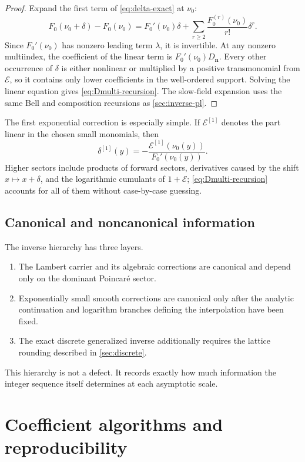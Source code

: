 \documentclass[11pt,oneside]{article}
\numberwithin{equation}{section}
\theoremstyle{plain}
\theoremstyle{definition}
\theoremstyle{remark}
\begin{document}
\begin{proof}
Expand the first term of \eqref{eq:delta-exact} at $\nu_0$:
\[
 F_0(\nu_0+\delta)-F_0(\nu_0)
 =F_0'(\nu_0)\delta+
  \sum_{r\ge2}\frac{F_0^{(r)}(\nu_0)}{r!}\delta^r.
\]
Since $F_0'(\nu_0)$ has nonzero leading term $\lambda$, it is invertible.
At any nonzero multiindex, the coefficient of the linear term is
$F_0'(\nu_0)D_{\bm n}$.  Every other occurrence of $\delta$ is either
nonlinear or multiplied by a positive transmonomial from $\mathcal E$, so it
contains only lower coefficients in the well-ordered support.  Solving the
linear equation gives \eqref{eq:Dmulti-recursion}.  The slow-field expansion
uses the same Bell and composition recursions as \cref{sec:inverse-pl}.
\end{proof}

The first exponential correction is especially simple.  If
$\mathcal E^{[1]}$ denotes the part linear in the chosen small monomials,
then
\begin{equation}\label{eq:first-exp-inverse}
 \boxed{
 \delta^{[1]}(y)=
 -\frac{\mathcal E^{[1]}(\nu_0(y))}{F_0'(\nu_0(y))}.}
\end{equation}
Higher sectors include products of forward sectors, derivatives caused by
the shift $x\mapsto x+\delta$, and the logarithmic cumulants of
$1+\mathcal E$; \eqref{eq:Dmulti-recursion} accounts for all of them without
case-by-case guessing.

\subsection{Canonical and noncanonical information}

The inverse hierarchy has three layers.
\begin{enumerate}
\item The Lambert carrier and its algebraic corrections are canonical and
      depend only on the dominant Poincar\'e sector.
\item Exponentially small smooth corrections are canonical only after the
      analytic continuation and logarithm branches defining the
      interpolation have been fixed.
\item The exact discrete generalized inverse additionally requires the
      lattice rounding described in \cref{sec:discrete}.
\end{enumerate}
This hierarchy is not a defect.  It records exactly how much information the
integer sequence itself determines at each asymptotic scale.

\section{Coefficient algorithms and reproducibility}\label{sec:algorithms}
\end{document}
